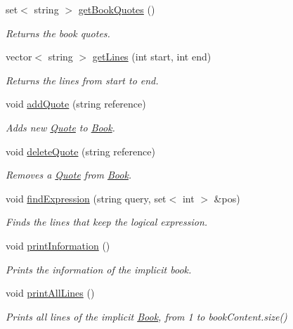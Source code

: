 \begin{DoxyCompactItemize}
set$<$ string $>$ \hyperlink{class_book_a7e0d6cb0827bc58637da5ba49b4e1944}{get\+Book\+Quotes} ()
\begin{DoxyCompactList}\small\item\em Returns the book quotes. \end{DoxyCompactList}\item 
vector$<$ string $>$ \hyperlink{class_book_acb5eaff231b512901cac3e3220ee2960}{get\+Lines} (int start, int end)
\begin{DoxyCompactList}\small\item\em Returns the lines from start to end. \end{DoxyCompactList}\item 
void \hyperlink{class_book_a97c2374d514327be5d8f74abd0ff4ea3}{add\+Quote} (string reference)
\begin{DoxyCompactList}\small\item\em Adds new \hyperlink{class_quote}{Quote} to \hyperlink{class_book}{Book}. \end{DoxyCompactList}\item 
void \hyperlink{class_book_a0829e0eaf0769c2bdbd149d2cf2ce20b}{delete\+Quote} (string reference)
\begin{DoxyCompactList}\small\item\em Removes a \hyperlink{class_quote}{Quote} from \hyperlink{class_book}{Book}. \end{DoxyCompactList}\item 
void \hyperlink{class_book_acc3fa87ab1c8eb2186a4c2e1e541f368}{find\+Expression} (string query, set$<$ int $>$ \&pos)
\begin{DoxyCompactList}\small\item\em Finds the lines that keep the logical expression. \end{DoxyCompactList}\item 
void \hyperlink{class_book_a5b67f59017da9d2654c27fa27927a419}{print\+Information} ()
\begin{DoxyCompactList}\small\item\em Prints the information of the implicit book. \end{DoxyCompactList}\item 
void \hyperlink{class_book_a07076ae8fe5e924f18bf7527e0ba5092}{print\+All\+Lines} ()
\begin{DoxyCompactList}\small\item\em Prints all lines of the implicit \hyperlink{class_book}{Book}, from 1 to book\+Content.\+size() \end{DoxyCompactList}\item 

\end{DoxyCompactItemize}

